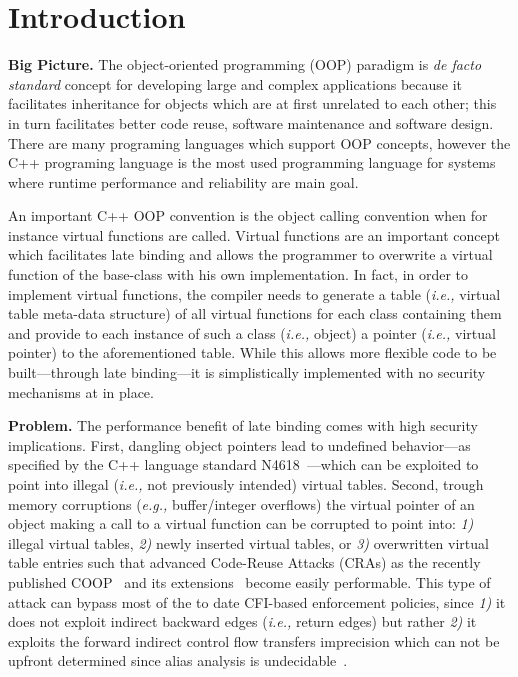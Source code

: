 \section{Introduction}
\label{chapter:Introduction}

\textbf{Big Picture.}
The object-oriented programming (OOP) paradigm is \textit{de facto standard} concept for developing large and complex 
applications because it facilitates inheritance for objects which are at first unrelated to each other; this in turn 
facilitates better code reuse, software maintenance and software design. There are many programing languages
which support OOP concepts, however the C++ programing language is the most used programming language for systems where 
runtime performance and reliability are main goal.

An important C++ OOP convention is the object calling convention when for instance virtual functions are called.
Virtual functions are an important concept which facilitates late binding and allows the programmer to overwrite a
virtual function of the base-class with his own implementation. In fact, in order to implement virtual functions, 
the compiler needs to generate a table (\textit{i.e.,} virtual table meta-data structure) of all
virtual functions for each class containing them and provide to each instance of such a class (\textit{i.e.,} object) a pointer (\textit{i.e.,} virtual pointer)
to the aforementioned table. While this allows more flexible code to be built---through late binding---it is simplistically implemented with no security
mechanisms at in place.

\textbf{Problem.}
The performance benefit of late binding comes with high security implications. 
First, dangling object pointers lead to undefined behavior---as specified by the C++ language standard N4618~\cite{N4618}---which 
can be exploited to point into illegal (\textit{i.e.,} not previously intended) virtual tables.
Second, trough memory corruptions (\textit{e.g.,} buffer/integer overflows) the virtual pointer of an object making a 
call to a virtual function can be corrupted to point into:
\textit{1)} illegal virtual tables, 
\textit{2)} newly inserted virtual tables, or
\textit{3)} overwritten virtual table entries
such that advanced Code-Reuse Attacks (CRAs) as the recently published COOP~\cite{schuster:coop} 
and its extensions~\cite{crane:readactor++, crane:readactor++, subversive-c:lettner, ctf:coop, loop:oriented} 
become easily performable. This type of attack can bypass most of the to date CFI-based enforcement policies, since
\textit{1)} it does not exploit indirect backward edges (\textit{i.e.,} return edges) but rather
\textit{2)} it exploits the forward indirect control flow transfers imprecision which can not be upfront 
determined since alias analysis is undecidable~\cite{alias:undecidable}.

